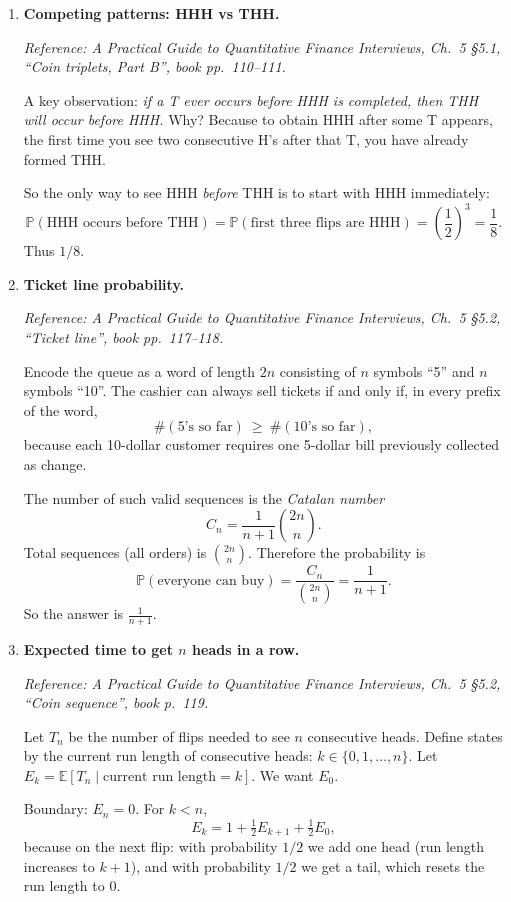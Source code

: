 \documentclass[11pt]{article}
\begin{document}
\begin{enumerate}[leftmargin=*, itemsep=1.0em]
\item \textbf{Competing patterns: HHH vs THH.}

\textit{Reference: A Practical Guide to Quantitative Finance Interviews, Ch.\ 5 \S5.1, ``Coin triplets, Part B'', book pp.\ 110--111.}

\medskip
A key observation: \emph{if a T ever occurs before HHH is completed, then THH will occur before HHH.}
Why? Because to obtain HHH after some T appears, the first time you see two consecutive H's after that T, you have already formed THH.

So the only way to see HHH \emph{before} THH is to start with HHH immediately:
\[
\mathbb{P}(\text{HHH occurs before THH})=\mathbb{P}(\text{first three flips are HHH})=\left(\frac12\right)^3=\frac18.
\]
Thus $\boxed{1/8}$.

\item \textbf{Ticket line probability.}

\textit{Reference: A Practical Guide to Quantitative Finance Interviews, Ch.\ 5 \S5.2, ``Ticket line'', book pp.\ 117--118.}

\medskip
Encode the queue as a word of length $2n$ consisting of $n$ symbols ``5'' and $n$ symbols ``10''.
The cashier can always sell tickets if and only if, in every prefix of the word,
\[
\#(\text{5's so far})\ \ge\ \#(\text{10's so far}),
\]
because each 10-dollar customer requires one 5-dollar bill previously collected as change.

The number of such valid sequences is the \emph{Catalan number}
\[
C_n=\frac{1}{n+1}\binom{2n}{n}.
\]
Total sequences (all orders) is $\binom{2n}{n}$. Therefore the probability is
\[
\mathbb{P}(\text{everyone can buy})=\frac{C_n}{\binom{2n}{n}}=\frac{1}{n+1}.
\]
So the answer is $\boxed{\frac{1}{n+1}}$.

\item \textbf{Expected time to get $n$ heads in a row.}

\textit{Reference: A Practical Guide to Quantitative Finance Interviews, Ch.\ 5 \S5.2, ``Coin sequence'', book p.\ 119.}

\medskip
Let $T_n$ be the number of flips needed to see $n$ consecutive heads. Define states by the current run length of consecutive heads: $k\in\{0,1,\dots,n\}$.
Let $E_k=\mathbb{E}[T_n \mid \text{current run length}=k]$. We want $E_0$.

Boundary: $E_n=0$. For $k<n$,
\[
E_k = 1 + \tfrac12 E_{k+1} + \tfrac12 E_0,
\]
because on the next flip: with probability $1/2$ we add one head (run length increases to $k+1$),
and with probability $1/2$ we get a tail, which resets the run length to $0$.


\end{enumerate}
\end{document}
